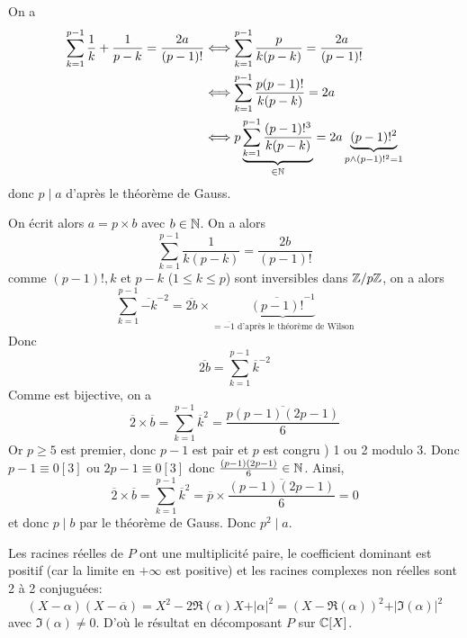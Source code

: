 \begin{solution}
	On a 
	\begin{align*}
		\sum_{k=1}^{p-1}\frac{1}{k}+\frac{1}{p-k}=\frac{2a}{(p-1)!}
		&\Longleftrightarrow \sum_{k=1}^{p-1}\frac{p}{k(p-k)}=\frac{2a}{(p-1)!}\\
		&\Longleftrightarrow \sum_{k=1}^{p-1}\frac{p(p-1)!}{k(p-k)}=2a\\
		&\Longleftrightarrow p\underbrace{\sum_{k=1}^{p-1}\frac{(p-1)!^{3}}{k(p-k)}}_{\in\mathbb{N}}=2a\underbrace{(p-1)!^{2}}_{p\wedge (p-1)!^{2}=1}
	\end{align*}
	donc $p\mid a$ d'après le théorème de Gauss.

	On écrit alors $a=p\times b$ avec $b\in\mathbb{N}$. On a alors
	$$\sum_{k=1}^{p-1}\frac{1}{k(p-k)}=\frac{2b}{(p-1)!}$$
	comme $(p-1)!,k$ et $p-k$ ($1\leqslant k\leqslant p$) sont inversibles dans $\mathbb{Z}/p\mathbb{Z}$, on a alors
	$$\sum_{k=1}^{p-1}\overline{-k}^{-2}=\overline{2b}\times\underbrace{\overline{(p-1)!}^{-1}}_{=\overline{-1}\text{ d'après le théorème de Wilson}}$$
	Donc 
	$$\overline{2b}=\sum_{k=1}^{p-1}\overline{k}^{-2}$$
	Comme 
	est bijective, on a 
	$$\overline{2}\times\overline{b}=\sum_{k=1}^{p-1}\overline{k}^{2}=\overline{\frac{p(p-1)(2p-1)}{6}}$$
	Or $p\geqslant5$ est premier, donc $p-1$ est pair et $p$ est congru ) 1 ou 2 modulo 3. Donc $p-1\equiv0[3]$ ou $2p-1\equiv0[3]$ donc $\frac{(p-1)(2p-1)}{6}\in\mathbb{N}$. Ainsi, 
	$$\overline{2}\times\overline{b}=\sum_{k=1}^{p-1}\overline{k}^{2}=\overline{p}\times\overline{\frac{(p-1)(2p-1)}{6}}=0$$
	et donc $p\mid b$ par le théorème de Gauss. Donc $p^{2}\mid a$.
\end{solution}

\begin{solution}
	Les racines réelles de $P$ ont une multiplicité paire, le coefficient dominant est positif (car la limite en $+\infty$ est positive) et les racines complexes non réelles sont 2 à 2 conjuguées:
	$$(X-\alpha)(X-\overline{\alpha})=X^{2}-2\Re(\alpha)X+\vert\alpha\vert^{2}=(X-\Re(\alpha))^{2}+\vert\Im(\alpha)\vert^{2}$$
	avec $\Im(\alpha)\neq0$.
	D'où le résultat en décomposant $P$ sur $\mathbb{C}[X]$.
\end{solution}

